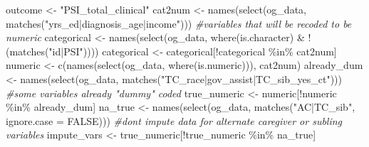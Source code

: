 \documentclass[
]{article}
\newenvironment{Shaded}{\begin{snugshade}}{\end{snugshade}}
\newcommand{\AttributeTok}[1]{\textcolor[rgb]{0.77,0.63,0.00}{#1}}
\newcommand{\CommentTok}[1]{\textcolor[rgb]{0.56,0.35,0.01}{\textit{#1}}}
\newcommand{\ConstantTok}[1]{\textcolor[rgb]{0.00,0.00,0.00}{#1}}
\newcommand{\FunctionTok}[1]{\textcolor[rgb]{0.00,0.00,0.00}{#1}}
\newcommand{\NormalTok}[1]{#1}
\newcommand{\OtherTok}[1]{\textcolor[rgb]{0.56,0.35,0.01}{#1}}
\newcommand{\SpecialCharTok}[1]{\textcolor[rgb]{0.00,0.00,0.00}{#1}}
\newcommand{\StringTok}[1]{\textcolor[rgb]{0.31,0.60,0.02}{#1}}
\begin{document}
\begin{Shaded}
\begin{Highlighting}[]
\NormalTok{outcome }\OtherTok{\textless{}{-}} \StringTok{"PSI\_total\_clinical"}
\NormalTok{cat2num }\OtherTok{\textless{}{-}} \FunctionTok{names}\NormalTok{(}\FunctionTok{select}\NormalTok{(og\_data, }\FunctionTok{matches}\NormalTok{(}\StringTok{"yrs\_ed|diagnosis\_age|income"}\NormalTok{))) }\CommentTok{\#variables that will be recoded to be numeric}
\NormalTok{categorical }\OtherTok{\textless{}{-}} \FunctionTok{names}\NormalTok{(}\FunctionTok{select}\NormalTok{(og\_data, }\FunctionTok{where}\NormalTok{(is.character) }\SpecialCharTok{\&} \SpecialCharTok{!}\NormalTok{(}\FunctionTok{matches}\NormalTok{(}\StringTok{"id|PSI"}\NormalTok{))))}
\NormalTok{categorical }\OtherTok{\textless{}{-}}\NormalTok{ categorical[}\SpecialCharTok{!}\NormalTok{categorical }\SpecialCharTok{\%in\%}\NormalTok{ cat2num]}
\NormalTok{numeric }\OtherTok{\textless{}{-}} \FunctionTok{c}\NormalTok{(}\FunctionTok{names}\NormalTok{(}\FunctionTok{select}\NormalTok{(og\_data, }\FunctionTok{where}\NormalTok{(is.numeric))), cat2num)}
\NormalTok{already\_dum }\OtherTok{\textless{}{-}} \FunctionTok{names}\NormalTok{(}\FunctionTok{select}\NormalTok{(og\_data, }\FunctionTok{matches}\NormalTok{(}\StringTok{"TC\_race|gov\_assist|TC\_sib\_yes\_ct"}\NormalTok{))) }\CommentTok{\#some variables already "dummy" coded}
\NormalTok{true\_numeric }\OtherTok{\textless{}{-}}\NormalTok{ numeric[}\SpecialCharTok{!}\NormalTok{numeric }\SpecialCharTok{\%in\%}\NormalTok{ already\_dum]}
\NormalTok{na\_true }\OtherTok{\textless{}{-}} \FunctionTok{names}\NormalTok{(}\FunctionTok{select}\NormalTok{(og\_data, }\FunctionTok{matches}\NormalTok{(}\StringTok{"AC|TC\_sib"}\NormalTok{, }\AttributeTok{ignore.case =} \ConstantTok{FALSE}\NormalTok{))) }\CommentTok{\#don\textquotesingle{}t impute data for alternate caregiver or subling variables}
\NormalTok{impute\_vars }\OtherTok{\textless{}{-}}\NormalTok{ true\_numeric[}\SpecialCharTok{!}\NormalTok{true\_numeric }\SpecialCharTok{\%in\%}\NormalTok{ na\_true]}


\end{Highlighting}
\end{Shaded}
\end{document}
